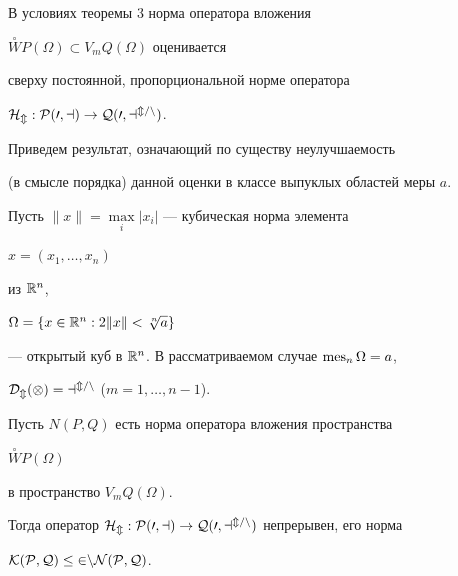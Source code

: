  


В условиях теоремы 3 норма оператора вложения 


$\overset{\circ}{W}P(\Omega)\subset V_mQ(\Omega)$ оценивается 


сверху постоянной, пропорциональной норме оператора 


$\cal H_m:P(0,a)\to Q(0,a^{m/n})$. 


Приведем результат, означающий по существу неулучшаемость 


(в смысле порядка) данной оценки в классе выпуклых областей меры $a$. 


 


Пусть $\|x\|=\max\limits_i|x_i|$ --- кубическая норма элемента 


$x=(x_1,\dotsc,x_n)$ 


из $\Bbb R^n$,


$\Omega=\{x\in\Bbb R^n:2\|x\|<\sqrt[\uproot{1}\leftroot{-1}n]{a}\}$ 


--- открытый куб в $\Bbb R^n$. В рассматриваемом случае $\operatorname{mes}_n\Omega=a$, 


$\cal D_m(\Omega)=a^{m/n}$ ($m=1,\dotsc,n-1$). 


 




\begin{thm} 


Пусть $N(P,Q)$ есть норма оператора вложения пространства 


$\overset{\circ}{W}P(\Omega)$ 


в пространство $V_mQ(\Omega)$. 


Тогда оператор $\cal H_m:P(0,a)\to Q(0,a^{m/n})$ непрерывен, его норма 


$\cal K(P,Q)\le 2nN(P,Q)$. 


\end{thm} 


 


